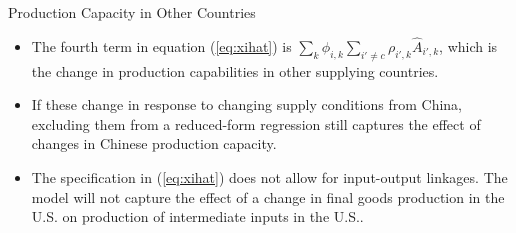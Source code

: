 \documentclass[aspectratio=169]{beamer}
\begin{document}

\begin{frame}{Production Capacity in Other Countries}

\begin{itemize}
    \item<1-> The fourth term in equation (\ref{eq:xihat}) is $ \sum_{k} \phi_{i,k} \sum_{i' \neq c} \rho_{i',k} \hat{A}_{i',k} $, which is the change in production capabilities in other supplying countries.
    \item<2-> If these change in response to changing supply conditions from China, excluding them from a reduced-form regression still captures the effect of changes in Chinese production capacity.
    \item<3-> The specification in (\ref{eq:xihat}) does not allow for input-output linkages.  The model will not capture the effect of a change in final goods production in the U.S. on production of intermediate inputs in the U.S..
\end{itemize}
    
\end{frame}

\end{document}
